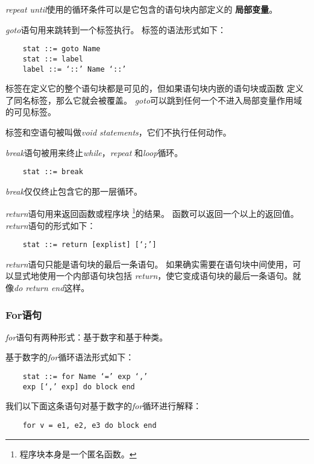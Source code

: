 \documentclass{ctexart}
\begin{document}
\emph{repeat until}使用的循环条件可以是它包含的语句块内部定义的
\textbf{局部变量}。

\emph{goto}语句用来跳转到一个标签执行。
标签的语法形式如下：

\lstset{language=C}
\begin{lstlisting}
	stat ::= goto Name
	stat ::= label
	label ::= ‘::’ Name ‘::’
\end{lstlisting}

标签在定义它的整个语句块都是可见的，但如果语句块内嵌的语句块或函数
定义了同名标签，那么它就会被覆盖。
\emph{goto}可以跳到任何一个不进入局部变量作用域的可见标签。

标签和空语句被叫做\emph{void statements}，它们不执行任何动作。

\emph{break}语句被用来终止\emph{while}，\emph{repeat}
和\emph{loop}循环。

\lstset{language=C}
\begin{lstlisting}
	stat ::= break
\end{lstlisting}

\emph{break}仅仅终止包含它的那一层循环。

\emph{return}语句用来返回函数或程序块
\footnote{程序块本身是一个匿名函数。}的结果。
函数可以返回一个以上的返回值。
\emph{return}语句的形式如下：

\lstset{language=C}
\begin{lstlisting}
	stat ::= return [explist] [‘;’]
\end{lstlisting}

\emph{return}语句只能是语句块的最后一条语句。
如果确实需要在语句块中间使用，可以显式地使用一个内部语句块包括
\emph{return}，使它变成语句块的最后一条语句。就像\emph{do return end}这样。

\subsubsection{For语句}

\emph{for}语句有两种形式：基于数字和基于种类。

基于数字的\emph{for}循环语法形式如下：

\lstset{language=C}
\begin{lstlisting}
	stat ::= for Name ‘=’ exp ‘,’
	exp [‘,’ exp] do block end
\end{lstlisting}

我们以下面这条语句对基于数字的\emph{for}循环进行解释：

\lstset{language=C}
\begin{lstlisting}
	for v = e1, e2, e3 do block end
\end{lstlisting}
\end{document}

